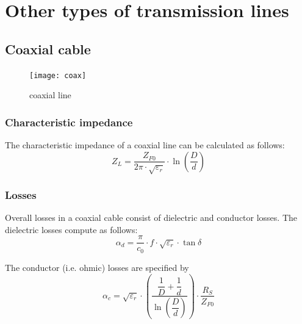 %
%
%
%

\chapter{Other types of transmission lines}

\section{Coaxial cable}

\begin{figure}[ht]
\begin{center}
\texttt{[image: coax]}
\end{center}
\caption{coaxial line}
\label{fig:coax}
\end{figure}
\FloatBarrier

\subsection{Characteristic impedance}

The characteristic impedance of a coaxial line can be calculated as follows:
\begin{equation}
Z_L = \dfrac{Z_{F0}}{2\pi\cdot\sqrt{\varepsilon_r}}\cdot\ln{\left(\dfrac{D}{d}\right)}
\end{equation}

\subsection{Losses}

Overall losses in a coaxial cable consist of dielectric and conductor
losses.  The dielectric losses compute as follows:
\begin{equation}
\alpha_d = \dfrac{\pi}{c_0}\cdot f\cdot \sqrt{\varepsilon_r} \cdot \tan{\delta}
\end{equation}

The conductor (i.e. ohmic) losses are specified by
\begin{equation}
\alpha_c = \sqrt{\varepsilon_r} \cdot\left(\dfrac{\dfrac{1}{D} + \dfrac{1}{d}}{\ln{\left(\dfrac{D}{d}\right)}}\right)\cdot\dfrac{R_S}{Z_{F0}}
\end{equation}

